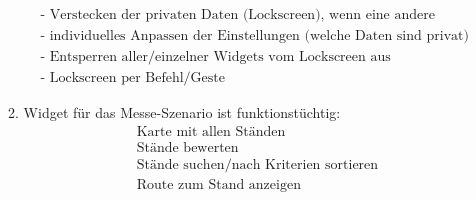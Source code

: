 \documentclass[10pt,a4paper]{article}
\begin{document}
\begin{enumerate}
\begin{enumerate}
\begin{align*}
&\text{- Verstecken der privaten Daten (Lockscreen), wenn eine andere Person das Sichtfeld der Kamera betritt} \\
&\text{- individuelles Anpassen der Einstellungen (welche Daten sind privat)} \\
&\text{- Entsperren aller/einzelner Widgets vom Lockscreen aus} \\
&\text{- Lockscreen per Befehl/Geste}
\end{align*}
\item Widget für das Messe-Szenario ist funktionstüchtig:
\begin{align*}
&\text{Karte mit allen Ständen} \\
&\text{Stände bewerten} \\
&\text{Stände suchen/nach Kriterien sortieren}\\
&\text{Route zum Stand anzeigen}
\end{align*}
\end{enumerate}
\end{enumerate}
\end{document}
